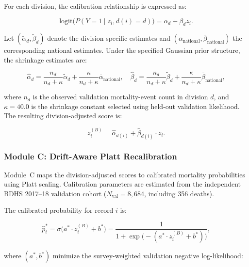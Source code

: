 \documentclass[a4paper,fleqn]{cas-sc}
\begin{document}
For each division, the calibration relationship is expressed as:

\begin{equation}
  \text{logit}\big(P(Y = 1 \mid z_i, d(i) = d)\big) = \alpha_d + \beta_d z_i.
  \label{eq:div_cal_model}
\end{equation}

Let $(\tilde{\alpha}_d,\tilde{\beta}_d)$ denote the division-specific estimates and $(\bar{\alpha}_{\text{national}},\bar{\beta}_{\text{national}})$ the corresponding national estimates. Under the specified Gaussian prior structure, the shrinkage estimates are:

\begin{equation}
  \hat{\alpha}_d = \frac{n_d}{n_d + \kappa} \tilde{\alpha}_d + \frac{\kappa}{n_d + \kappa} \bar{\alpha}_{\text{national}}, \quad
  \hat{\beta}_d = \frac{n_d}{n_d + \kappa} \tilde{\beta}_d + \frac{\kappa}{n_d + \kappa} \bar{\beta}_{\text{national}},
  \label{eq:eb_module_b}
\end{equation}

where $n_d$ is the observed validation mortality-event count in division $d$, and $\kappa=40.0$ is the shrinkage constant selected using held-out validation likelihood. The resulting division-adjusted score is:

\begin{equation}
  z_i^{(B)} = \hat{\alpha}_{d(i)} + \hat{\beta}_{d(i)} \cdot z_i.
  \label{eq:shrunk_logit}
\end{equation}

\subsubsection{Module C: Drift-Aware Platt Recalibration}
\label{sec:form_module_c}

Module~C maps the division-adjusted scores to calibrated mortality probabilities using Platt scaling. Calibration parameters are estimated from the independent BDHS 2017--18 validation cohort ($N_{\text{val}}=8{,}684$, including 356 deaths).

The calibrated probability for record $i$ is:

\begin{equation}
  \hat{p}_i^* = \sigma\big( a^* \cdot z_i^{(B)} + b^* \big) = \frac{1}{1 + \exp\Big( -(a^* \cdot z_i^{(B)} + b^*) \Big)},
  \label{eq:module_c_platt}
\end{equation}

where $(a^*,b^*)$ minimize the survey-weighted validation negative log-likelihood:
\end{document}
